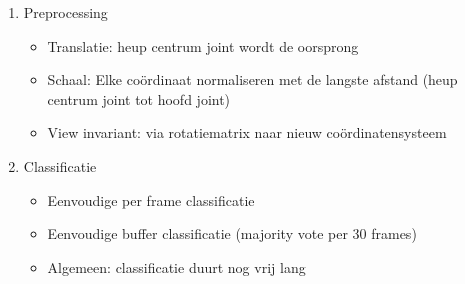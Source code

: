 \documentclass[]{beamer}
\begin{document}
	
	\begin{frame}
		\begin{enumerate}
			\item Preprocessing
			\begin{itemize}
				\item Translatie: heup centrum joint wordt de oorsprong
				\item Schaal: Elke coördinaat normaliseren met de langste afstand (heup centrum joint tot hoofd joint)
				\item View invariant: via rotatiematrix naar nieuw coördinatensysteem
			\end{itemize} 
			\item Classificatie
			\begin{itemize}
				\item Eenvoudige per frame classificatie
				\item Eenvoudige buffer classificatie (majority vote per 30 frames)
				\item Algemeen: classificatie duurt nog vrij lang
			
			\end{itemize}
		\end{enumerate}
	\end{frame}
\end{document}
